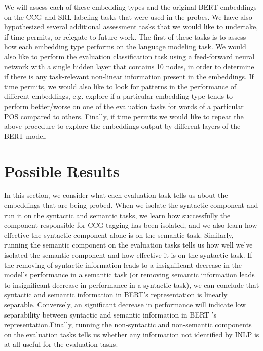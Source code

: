\documentclass[11pt,a4paper]{article}
\begin{document}
We will assess each of these embedding types and the original BERT embeddings on the CCG and SRL labeling tasks that were used in the probes. We have also hypothesized several additional assessment tasks that we would like to undertake, if time permits, or relegate to future work. The first of these tasks is to assess how each embedding type performs on the language modeling task. We would also like to perform the evaluation classification task using a feed-forward neural network with a single hidden layer that contains 10 nodes, in order to determine if there is any task-relevant non-linear information present in the embeddings. If time permits, we would also like to look for patterns in the performance of different embeddings, e.g. explore if a particular embedding type tends to perform better/worse on one of the evaluation tasks for words of a particular POS compared to others. Finally, if time permits we would like to repeat the above procedure to explore the embeddings output by different layers of the BERT model. 




\section{Possible Results}
\label{sec:result}

In this section, we consider what each evaluation task tells us about the embeddings that are being probed. When we isolate the syntactic component and run it on the syntactic and semantic tasks, we learn how successfully the component responsible for CCG tagging has been isolated, and we also learn how effective the syntactic component alone is on the semantic task. Similarly, running the semantic component on the evaluation tasks tells us how well we've isolated the semantic component and how effective it is on the syntactic task. If the removing of syntactic information leads to a insignificant decrease in the model\rq s performance in a semantic task (or removing semantic information leads to insignificant decrease in performance in a syntactic task), we can conclude that syntactic and semantic information in BERT\rq s representation is linearly separable. Conversely, an significant decrease in performance will indicate low separability between syntactic and semantic information in BERT \rq s representation.Finally, running the non-syntactic and non-semantic components on the evaluation tasks tells us whether any information not identified by INLP is at all useful for the evaluation tasks.
\end{document}
